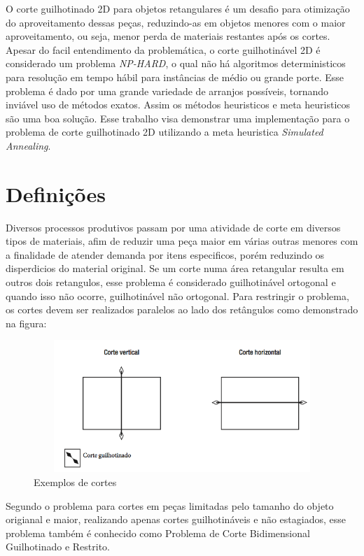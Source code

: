 \documentclass[12pt]{article}
\begin{document}
O corte guilhotinado 2D para objetos retangulares é um desafio para otimização do aproveitamento dessas peças, reduzindo-as em objetos menores com o maior aproveitamento, ou seja, menor perda de materiais restantes após os cortes. 
Apesar do facil entendimento da problemática, o corte guilhotinável 2D é considerado um problema \textit{NP-HARD}, o qual não há algoritmos deterministicos para resolução em tempo hábil para instâncias de médio ou grande porte.
Esse problema é dado por uma grande variedade de arranjos possíveis, tornando inviável uso de métodos exatos. Assim os métodos heuristicos e meta heuristicos são uma boa solução.
Esse trabalho visa demonstrar uma implementação para o problema de corte guilhotinado 2D utilizando a meta heuristica \textit{Simulated Annealing}. 

\section*{Definições}
	
	Diversos processos produtivos passam por uma atividade de corte em diversos tipos de materiais, afim de reduzir uma peça maior em várias outras menores com a finalidade de atender demanda por itens especificos, porém reduzindo os disperdicios do material original. 
	Se um corte numa área retangular resulta em outros dois retangulos, esse problema é considerado guilhotinável ortogonal e quando isso não ocorre, guilhotinável não ortogonal. Para restringir o problema, os cortes devem ser realizados paralelos ao lado dos retângulos como demonstrado na figura:
	
	\begin{figure}[h]
    \centering
    \includegraphics[width=15cm, height=5cm]{imagens/guilhotine2}
    \caption{Exemplos de cortes}
  \end{figure}
	
		Segundo  \cite{cutint} o problema para cortes em peças limitadas pelo tamanho do objeto origianal e maior, realizando apenas cortes guilhotináveis e não estagiados, esse problema também é conhecido como  Problema de Corte Bidimensional Guilhotinado e Restrito.
	
\end{document}

